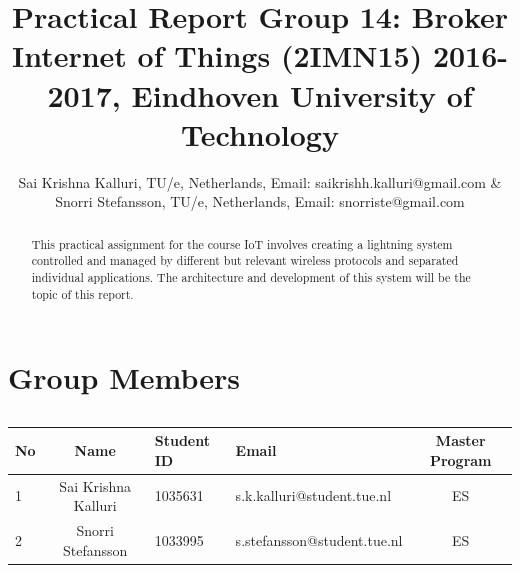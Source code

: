 \documentclass[11pt]{article}
\begin{document}
\title{Practical Report Group 14: Broker\\ {\fontsize{13}{0}\selectfont Internet of Things (2IMN15) 2016-2017, Eindhoven University of Technology}}

\author{Sai Krishna Kalluri, TU/e, Netherlands, 
		Email: saikrishh.kalluri@gmail.com \& \\  Snorri Stefansson, TU/e, Netherlands, Email: snorriste@gmail.com}
\maketitle

\begin{abstract}
	This practical assignment for the course IoT involves creating a lightning system controlled and managed by different but relevant wireless protocols and separated individual applications. The architecture and development of this system will be the topic of this report.\\	
\end{abstract}
\pagebreak
\tableofcontents

\pagebreak

\section{Group Members}
\begin{table}[htbp]
	\caption{}
	\begin{tabular}{lcllc}
		\toprule
		No & Name & Student ID & Email & Master Program \\ 
		\midrule
		1 & Sai Krishna Kalluri & 1035631 & s.k.kalluri@student.tue.nl & ES \\ 
		2 & Snorri Stefansson & 1033995 & s.stefansson@student.tue.nl & ES \\ 
		\toprule
	\end{tabular}
	\label{}
\end{table}
\end{document}
